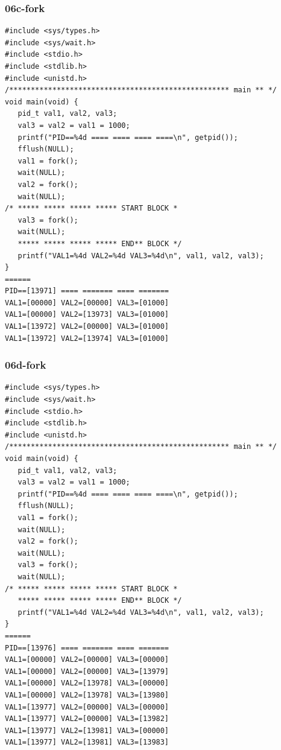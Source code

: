 \documentclass[xcolor=table, notheorems, hyperref={pdfpagelabels=false}]{beamer}
\begin{document}
\begin{frame}[fragile]
\frametitle{06c-fork}
\begin{lstlisting}[basicstyle=\ttfamily\tiny]
#include <sys/types.h>
#include <sys/wait.h>
#include <stdio.h>
#include <stdlib.h>
#include <unistd.h>
/*************************************************** main ** */
void main(void) {
   pid_t val1, val2, val3;
   val3 = val2 = val1 = 1000;
   printf("PID==%4d ==== ==== ==== ====\n", getpid());
   fflush(NULL);
   val1 = fork();
   wait(NULL);
   val2 = fork();
   wait(NULL);
/* ***** ***** ***** ***** START BLOCK *
   val3 = fork();
   wait(NULL);
   ***** ***** ***** ***** END** BLOCK */
   printf("VAL1=%4d VAL2=%4d VAL3=%4d\n", val1, val2, val3);
}
======
PID==[13971] ==== ======= ==== =======
VAL1=[00000] VAL2=[00000] VAL3=[01000]
VAL1=[00000] VAL2=[13973] VAL3=[01000]
VAL1=[13972] VAL2=[00000] VAL3=[01000]
VAL1=[13972] VAL2=[13974] VAL3=[01000]

\end{lstlisting}
\end{frame}

\begin{frame}[fragile]
\frametitle{06d-fork}
\begin{lstlisting}[basicstyle=\ttfamily\tiny]
#include <sys/types.h>
#include <sys/wait.h>
#include <stdio.h>
#include <stdlib.h>
#include <unistd.h>
/*************************************************** main ** */
void main(void) {
   pid_t val1, val2, val3;
   val3 = val2 = val1 = 1000;
   printf("PID==%4d ==== ==== ==== ====\n", getpid());
   fflush(NULL);
   val1 = fork();
   wait(NULL);
   val2 = fork();
   wait(NULL);
   val3 = fork();
   wait(NULL);
/* ***** ***** ***** ***** START BLOCK *
   ***** ***** ***** ***** END** BLOCK */
   printf("VAL1=%4d VAL2=%4d VAL3=%4d\n", val1, val2, val3);
}
======
PID==[13976] ==== ======= ==== =======
VAL1=[00000] VAL2=[00000] VAL3=[00000]
VAL1=[00000] VAL2=[00000] VAL3=[13979]
VAL1=[00000] VAL2=[13978] VAL3=[00000]
VAL1=[00000] VAL2=[13978] VAL3=[13980]
VAL1=[13977] VAL2=[00000] VAL3=[00000]
VAL1=[13977] VAL2=[00000] VAL3=[13982]
VAL1=[13977] VAL2=[13981] VAL3=[00000]
VAL1=[13977] VAL2=[13981] VAL3=[13983]

\end{lstlisting}
\end{frame}
\end{document}
